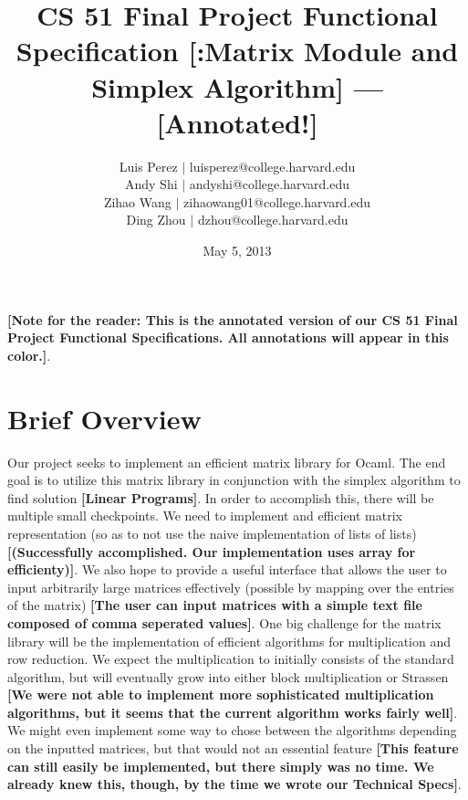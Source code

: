 \documentclass[letterpaper,11pt]{article}
\newcommand{\annot}[1]{\textbf{\color{BrickRed} [#1]}}
\begin{document}
\title{CS 51 Final Project Functional Specification{\annot{:Matrix Module and Simplex Algorithm}}
---{\annot{Annotated!}}}
\author{
Luis Perez $|$ luisperez@college.harvard.edu \\ 
Andy Shi $|$ andyshi@college.harvard.edu \\ 
Zihao Wang $|$ zihaowang01@college.harvard.edu \\ 
Ding Zhou $|$ dzhou@college.harvard.edu
}
\date{May 5, 2013}
\maketitle

{\annot{Note for the reader: This is the annotated version of our CS 51 
Final Project Functional Specifications. All annotations will appear in this color.}}.

\section{Brief Overview}

Our project seeks to implement an efficient matrix library for Ocaml. The end
goal is to utilize this matrix library in conjunction with the simplex algorithm
to find solution {\annot{Linear Programs}}. In order to accomplish this,
there will be multiple small checkpoints. We need to implement and efficient
matrix representation (so as to not use the naive implementation of lists of
lists){\annot{(Successfully accomplished. Our implementation uses array for efficienty)}}.
 We also hope to provide a useful interface that allows the user to input
arbitrarily large matrices effectively (possible by mapping over the entries of
the matrix){\annot{The user can input matrices with a simple text file composed of comma
seperated values}}. One big challenge for the matrix library will be the implementation
of efficient algorithms for multiplication and row reduction. We expect the
multiplication to initially consists of the standard algorithm, but will
eventually grow into either block multiplication or Strassen {\annot{We were not
able to implement more sophisticated multiplication algorithms, but it seems that the current
algorithm works fairly well}}. We might even implement some way to chose between the 
algorithms depending on the inputted matrices, but that would not an essential feature 
{\annot{This feature can still easily be implemented, but there simply was no time. We
already knew this, though, by the time we wrote our Technical Specs}}.
\end{document}
